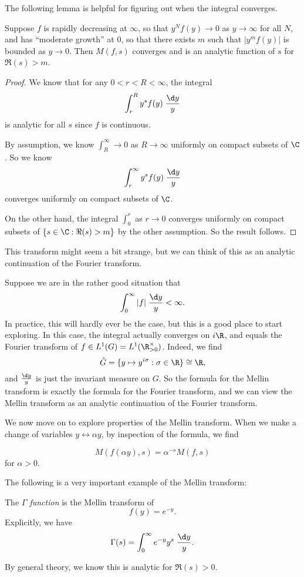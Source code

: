 \documentclass[a4paper]{article}
\begin{document}
The following lemma is helpful for figuring out when the integral converges.
\begin{lemma}
  Suppose $f$ is rapidly decreasing at $\infty$, so that $y^N f(y) \to 0$ as $y \to \infty$ for all $N$, and has ``moderate growth'' at $0$, so that there exists $m$ such that $|y^m f(y)|$ is bounded as $y \to 0$. Then $M(f, s)$ converges and is an analytic function of $s$ for $\Re(s) > m$.
\end{lemma}

\begin{proof}
  We know that for any $0 < r < R < \infty$, the integral
  \[
    \int_r^R y^s f(y) \;\frac{\d y}{y}
  \]
  is analytic for all $s$ since $f$ is continuous.

  By assumption, we know $\int_R^\infty \to 0$ as $R \to \infty$ uniformly on compact subsets of $\C$. So we know
  \[
    \int_r^\infty y^s f(y) \;\frac{\d y}{y}
  \]
  converges uniformly on compact subsets of $\C$.

  On the other hand, the integral $\int_0^r$ as $r \to 0$ converges uniformly on compact subsets of $\{s \in \C: \Re(s) > m\}$ by the other assumption. So the result follows.
\end{proof}

This transform might seem a bit strange, but we can think of this as an analytic continuation of the Fourier transform.
\begin{eg}
  Suppose we are in the rather good situation that
  \[
    \int_0^\infty |f| \;\frac{\d y}{y} < \infty.
  \]
  In practice, this will hardly ever be the case, but this is a good place to start exploring. In this case, the integral actually converges on $i\R$, and equals the Fourier transform of $f \in L^1(G) = L^1(\R^\times_{>0})$. Indeed, we find
  \[
    \hat{G} = \{y \mapsto y^{i\sigma} : \sigma \in \R\} \cong \R,
  \]
  and $\frac{\d y}{y}$ is just the invariant measure on $G$. So the formula for the Mellin transform is exactly the formula for the Fourier transform, and we can view the Mellin transform as an analytic continuation of the Fourier transform.
\end{eg}
We now move on to explore properties of the Mellin transform. When we make a change of variables $y \leftrightarrow \alpha y$, by inspection of the formula, we find
\begin{prop}
  \[
    M(f(\alpha y), s) = \alpha^{-s} M(f, s)
  \]
  for $\alpha > 0$.
\end{prop}

The following is a very important example of the Mellin transform:
\begin{defi}
  The \emph{$\Gamma$ function} is the Mellin transform of
  \[
    f(y) = e^{-y}.
  \]
  Explicitly, we have
  \[
    \Gamma(s) = \int_0^\infty e^{-y} y^s \;\frac{\d y}{y}.
  \]
\end{defi}
By general theory, we know this is analytic for $\Re(s) > 0$.
\end{document}
